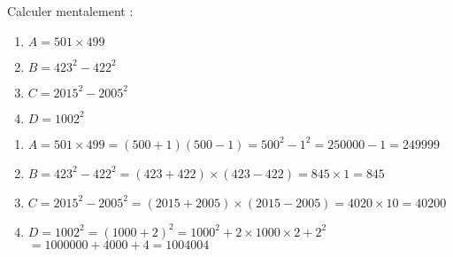
Calculer mentalement :
\begin{enumerate}
     \item
     $A=501\times 499$
     \item
     $B=423^{2}-422^{2}$
     \item
     $C=2015^{2}-2005^{2}$
     \item
     $D=1002^{2}$
\end{enumerate}
\begin{corrige}
     \begin{enumerate}
          \item
          $A=501\times 499=\left(500+1\right)\left(500-1\right) $\nosp$=500^{2}-1^{2}=250 000-1=249 999$
          \item
          $B=423^{2}-422^{2}=\left(423+422\right)\times \left(423-422\right) $\nosp$=845\times 1=845$
          \item
          $C=2015^{2}-2005^{2}=\left(2015+2005\right)\times \left(2015-2005\right)=4020\times 10 $\nosp$=40 200$
          \item
          $D=1002^{2}=\left(1000+2\right)^{2}=1000^{2}+2\times 1000\times 2+2^{2} $\nosp$=1000000+4000+4=1 004 004$
     \end{enumerate}
\end{corrige}


